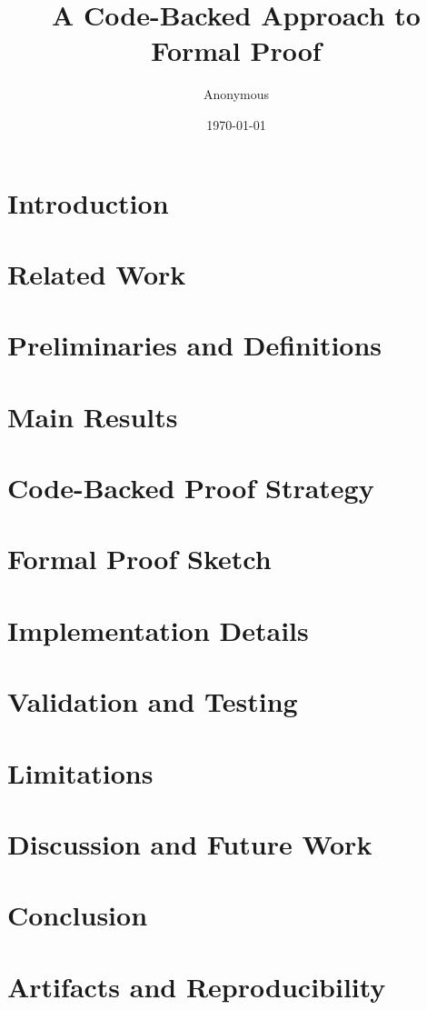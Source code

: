 \documentclass[11pt]{article}
\title{A Code-Backed Approach to Formal Proof}
\author{Anonymous}
\date{\today}
\theoremstyle{definition}
\theoremstyle{remark}
\begin{document}
\maketitle



\section{Introduction}


\section{Related Work}


\section{Preliminaries and Definitions}


\section{Main Results}


\section{Code-Backed Proof Strategy}


\section{Formal Proof Sketch}


\section{Implementation Details}


\section{Validation and Testing}


\section{Limitations}


\section{Discussion and Future Work}


\section{Conclusion}





\appendix
\section{Artifacts and Reproducibility}

\end{document}
